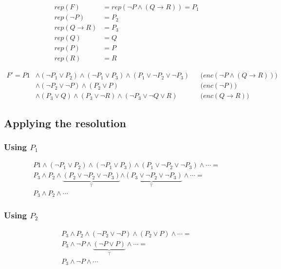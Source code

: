 \documentclass[a4paper,11pt]{report}
\begin{document}
\begin{align*}
  rep(F) &= rep(\neg P \wedge (Q \to R)) = P_1 \\
  rep(\neg P)   &= P_2\\
  rep(Q \to R) &= P_3 \\
  rep(Q) &= Q \\
  rep(P) &= P \\
  rep(R) &= R
\end{align*}

\begin{align*}
  F' = P1 &\wedge (\neg P_1 \vee P_2) \wedge (\neg P_1 \vee P_3) \wedge (P_1 \vee \neg P_2 \vee \neg P_3)
  && \text{($enc(\neg P \wedge (Q \to R))$)} \\
          &\wedge (\neg P_2 \vee \neg P) \wedge (P_2 \vee P)
  && \text{($enc(\neg P)$)} \\
          &\wedge (P_3 \vee Q) \wedge (P_3 \vee \neg R) \wedge (\neg P_3 \vee \neg Q \vee R)
  && \text{($enc(Q \to R)$)}
\end{align*}

\subsection*{Applying the resolution}

\subsubsection*{Using $P_1$}
\begin{gather*}
P1 \wedge (\neg P_1 \vee P_2) \wedge (\neg P_1 \vee P_3) \wedge (P_1 \vee \neg
P_2 \vee \neg P_3) \wedge \cdots = \\
P_3 \wedge P_2 \wedge \underbrace{(P_2 \vee \neg P_2 \vee \neg P_3)}_\top \underbrace{\wedge (P_3 \vee \neg
P_2 \vee \neg P_3)}_\top \wedge \cdots = \\
P_3 \wedge P_2 \wedge \cdots
\end{gather*}

\subsubsection*{Using $P_2$}

\begin{gather*}
  P_3 \wedge P_2 \wedge (\neg P_2 \vee \neg P) \wedge (P_2 \vee P) \wedge \cdots
  = \\
  P_3 \wedge \neg P \wedge \underbrace{(\neg P \vee P)}_\top \wedge \cdots = \\
  P_3 \wedge \neg P \wedge \cdots
\end{gather*}
\end{document}
